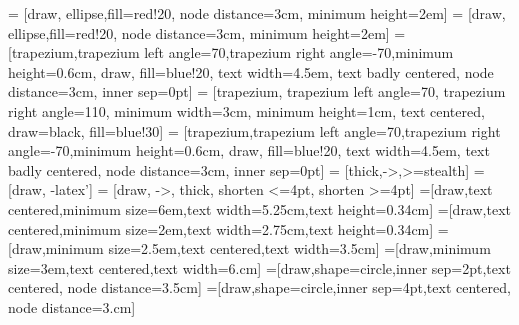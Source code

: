  = [draw, ellipse,fill=red!20, node distance=3cm, minimum height=2em]
 = [draw, ellipse,fill=red!20, node distance=3cm, minimum height=2em]
 = [trapezium,trapezium left angle=70,trapezium right angle=-70,minimum height=0.6cm, draw, fill=blue!20, text width=4.5em, text badly centered, node distance=3cm, inner sep=0pt]
 = [trapezium, trapezium left angle=70, trapezium right angle=110, minimum width=3cm, minimum height=1cm, text centered, draw=black, fill=blue!30]
 = [trapezium,trapezium left angle=70,trapezium right angle=-70,minimum height=0.6cm, draw, fill=blue!20, text width=4.5em, text badly centered, node distance=3cm, inner sep=0pt]
 = [thick,->,>=stealth]
 = [draw, -latex']
 = [draw, ->,  thick, shorten <=4pt, shorten >=4pt]
=[draw,text centered,minimum size=6em,text width=5.25cm,text height=0.34cm]
=[draw,text centered,minimum size=2em,text width=2.75cm,text height=0.34cm]
=[draw,minimum size=2.5em,text centered,text width=3.5cm]
=[draw,minimum size=3em,text centered,text width=6.cm]
=[draw,shape=circle,inner sep=2pt,text centered, node distance=3.5cm]
=[draw,shape=circle,inner sep=4pt,text centered, node distance=3.cm]
\addto{\captionsportuguese}{\renewcommand{\appendixname}{Anexo}}
\addto{\captionsportuguese}{\renewcommand{\appendixpagename}{Anexos}}
\addto{\captionsportuguese}{\renewcommand{\appendixtocname}{Anexos}}
\newtheorem{theorem}{Theorem}
\newtheorem{lemma}{Lemma}
\newtheorem{definition}{Defini\c{c}\~{a}o}
\newtheorem{notation}{Notation}
\makeatletter
\renewcommand{\@makechapterhead}[1]{%
	\vspace*{50 pt}%
	{\setlength{\parindent}{0pt} \raggedright \normalfont
		\bfseries\Huge\thechapter.\ #1
		\par\nobreak\vspace{40 pt}}}
